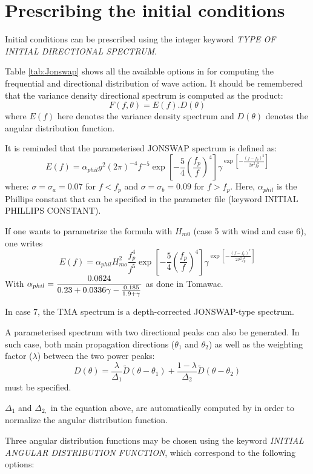 \section{ Prescribing the initial conditions}
\label{se:initcond}
 Initial conditions can be prescribed using the integer keyword \textit{TYPE OF INITIAL DIRECTIONAL SPECTRUM}.

Table \ref{tab:Jonswap} shows all the available options in \tomawac for computing the frequential and directional distribution of wave action. It should be remembered that the variance density directional spectrum is computed as the product:
\[F(f,\theta )=E(f).D(\theta )\]
where $E(f)$ here denotes the variance density spectrum and $D\left(\theta \right)$ denotes the angular distribution function.

 It is reminded that the parameterised JONSWAP spectrum is defined as:
\[E(f)=\alpha _{phil} g^{2} (2\pi )^{-4} f^{-5} \exp \left[-\frac{5}{4} \left(\frac{f_{p}^{} }{f^{} } \right)^{4} \right]\gamma ^{\exp \left[-\frac{\left(f-f_{p} \right)^{2} }{2\sigma ^{2} f_{p}^{2} } \right]} \]
where:  $\sigma =\sigma_{a} =0.07$ for  $f< f_{p}$  and  $\sigma =\sigma_{b} =0.09$ for  $f> f_{p}$. Here, $\alpha_{phil}$  is the Phillips constant that can be specified in the parameter file (keyword INITIAL PHILLIPS CONSTANT).

 If one wants to parametrize the formula with $H_{m0}$ (case 5 with wind and case 6), one writes
\[E(f)=\alpha _{phil} H_{mo}^{2} \frac{f_{p}^{4} }{f^{5} } \exp \left[-\frac{5}{4} \left(\frac{f_{p}^{} }{f^{} } \right)^{4} \right]\gamma ^{\exp \left[-\frac{\left(f-f_{p} \right)^{2} }{2\sigma ^{2} f_{p}^{2} } \right]} \]
With $\displaystyle \alpha _{phil} =\frac{0.0624}{0.23+0.0336\gamma -\frac{0.185}{1.9+\gamma } } $ as done in Tomawac.

 In case 7, the TMA spectrum is a depth-corrected JONSWAP-type spectrum.

 A parameterised spectrum with two directional peaks can also be generated. In such case, both main propagation directions ($\theta _{1} $ and $\theta _{2} $) as well as the weighting factor ($\lambda $) between the two power peaks:
\[D(\theta )=\frac{\lambda }{\Delta _{1} } \tilde{D}(\theta -\theta _{1} )+\frac{1-\lambda }{\Delta _{2} } \tilde{D}(\theta -\theta _{2} )\]
must be specified.

 $\Delta_{1}$ and $\Delta_{2,}$ in the equation above, are automatically computed by \tomawac in order to normalize the angular distribution function.

 Three angular distribution functions may be chosen using the keyword \textit{INITIAL ANGULAR DISTRIBUTION FUNCTION}, which correspond to the following options:

